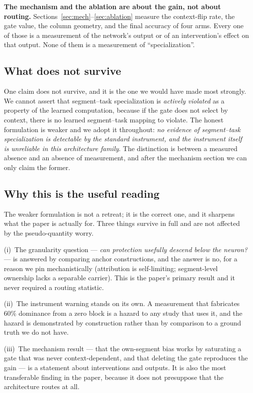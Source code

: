 \documentclass[10pt]{article}
\begin{document}
\textbf{The mechanism and the ablation are about the gain, not about
routing.} Sections~\ref{sec:mech}--\ref{sec:ablation} measure the
context-flip rate, the gate value, the column geometry, and the final
accuracy of four arms. Every one of those is a measurement of the
network's output or of an intervention's effect on that output. None of
them is a measurement of ``specialization''.

\subsection{What does not survive}

One claim does not survive, and it is the one we would have made most
strongly. We cannot assert that segment--task specialization is
\emph{actively violated} as a property of the learned computation, because
if the gate does not select by context, there is no learned
segment--task mapping to violate. The honest formulation is weaker and
we adopt it throughout: \emph{no evidence of segment--task specialization
is detectable by the standard instrument, and the instrument itself is
unreliable in this architecture family}. The distinction is between a
measured absence and an absence of measurement, and after the mechanism
section we can only claim the former.

\subsection{Why this is the useful reading}

The weaker formulation is not a retreat; it is the correct one, and it
sharpens what the paper is actually for. Three things survive in full
and are not affected by the pseudo-quantity worry.

(i)~The granularity question --- \emph{can protection usefully descend
below the neuron?} --- is answered by comparing anchor constructions, and
the answer is no, for a reason we pin mechanistically (attribution is
self-limiting; segment-level ownership lacks a separable carrier). This
is the paper's primary result and it never required a routing statistic.

(ii)~The instrument warning stands on its own. A measurement that
fabricates $60\%$ dominance from a zero block is a hazard to any study
that uses it, and the hazard is demonstrated by construction rather than
by comparison to a ground truth we do not have.

(iii)~The mechanism result --- that the own-segment bias works by
saturating a gate that was never context-dependent, and that deleting the
gate reproduces the gain --- is a statement about interventions and
outputs. It is also the most transferable finding in the paper, because
it does not presuppose that the architecture routes at all.
\end{document}
